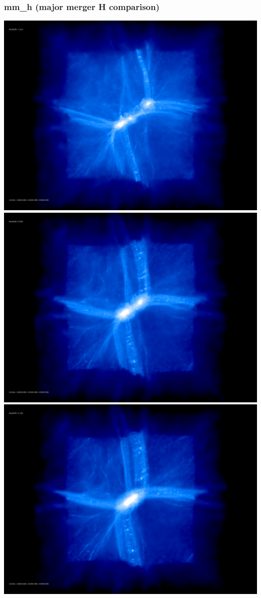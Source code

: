 % 
%
%
%
%
%
%
%


\newpage

\subsubsection{mm\_h (major merger H comparison)}
\includegraphics[scale=0.1]{r256/h100/mm_h/50.jpg} 
\includegraphics[scale=0.1]{r256/h100/mm_h/100.jpg} \\
\includegraphics[scale=0.1]{r256/h100/mm_h/150.jpg} 
